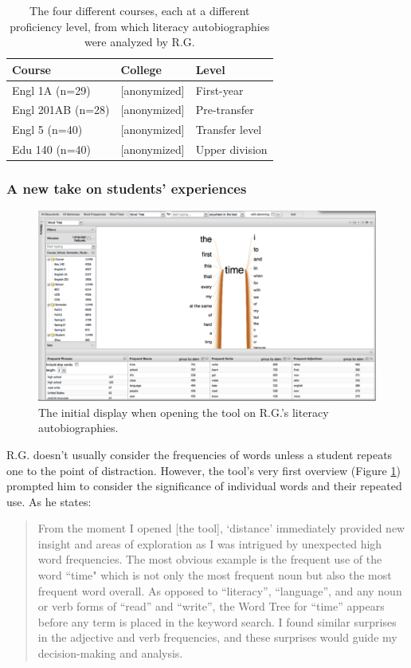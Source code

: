 \documentclass{sig-alternate}
\begin{document}
\begin{table}
\begin{tabular}{lll}
Course& College & Level \\
\hline
Engl 1A (n=29) & [anonymized] & First-year \\
Engl 201AB (n=28) & [anonymized] & Pre-transfer \\
Engl 5 (n=40) & [anonymized] & Transfer level \\
Edu 140 (n=40) & [anonymized] & Upper division \\
\end{tabular}
\caption{The four different courses, each at a different proficiency level, from which literacy autobiographies were analyzed by R.G. \label{table:rex-courses}}
\end{table}


 \subsubsection{A new take on students' experiences}

\begin{figure}
\includegraphics[width=\textwidth]{fig/rex/01.png}
\caption{The initial display when opening the tool \label{fig:rex01} on R.G.'s literacy autobiographies.}
\end{figure}

R.G. doesn't usually consider the frequencies of words unless a student repeats one to the point of distraction. However, the tool's very first overview (Figure \ref{fig:rex01}) prompted him to consider the significance of individual words and their repeated use.  As he states:
\begin{quote}
From the moment I opened [the tool], `distance' immediately provided new insight and areas of exploration as I was intrigued by unexpected high word frequencies.  The most obvious example is the frequent use of the word ``time" which is not only the most frequent noun but also the most frequent word overall.  As opposed to ``literacy'', ``language'', and any noun or verb forms of ``read'' and ``write'', the Word Tree for ``time'' appears before any term is placed in the keyword search.   I found similar surprises in the adjective and verb frequencies, and these surprises would guide my decision-making and analysis.
\end{quote}
\end{document}
